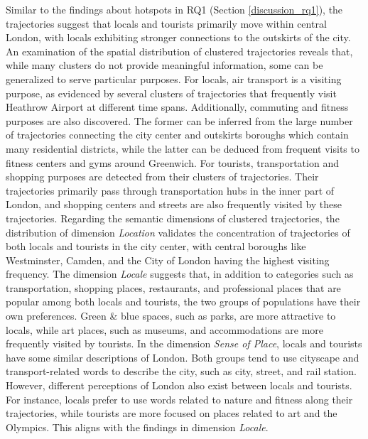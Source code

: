 \documentclass{article}
\theoremstyle{remark}
\begin{document}
Similar to the findings about hotspots in RQ1 (Section \ref{discussion_rq1}), the trajectories suggest that locals and tourists primarily move within central London, with locals exhibiting stronger connections to the outskirts of the city. An examination of the spatial distribution of clustered trajectories reveals that, while many clusters do not provide meaningful information, some can be generalized to serve particular purposes. For locals, air transport is a visiting purpose, as evidenced by several clusters of trajectories that frequently visit Heathrow Airport at different time spans. Additionally, commuting and fitness purposes are also discovered. The former can be inferred from the large number of trajectories connecting the city center and outskirts boroughs which contain many residential districts, while the latter can be deduced from frequent visits to fitness centers and gyms around Greenwich. For tourists, transportation and shopping purposes are detected from their clusters of trajectories. Their trajectories primarily pass through transportation hubs in the inner part of London, and shopping centers and streets are also frequently visited by these trajectories.
Regarding the semantic dimensions of clustered trajectories, the distribution of dimension \textit{Location} validates the concentration of trajectories of both locals and tourists in the city center, with central boroughs like Westminster, Camden, and the City of London having the highest visiting frequency. The dimension \textit{Locale} suggests that, in addition to categories such as transportation, shopping places, restaurants, and professional places that are popular among both locals and tourists, the two groups of populations have their own preferences. Green \& blue spaces, such as parks, are more attractive to locals, while art places, such as museums, and accommodations are more frequently visited by tourists. In the dimension \textit{Sense of Place}, locals and tourists have some similar descriptions of London. Both groups tend to use cityscape and transport-related words to describe the city, such as city, street, and rail station. However, different perceptions of London also exist between locals and tourists. For instance, locals prefer to use words related to nature and fitness along their trajectories, while tourists are more focused on places related to art and the Olympics. This aligns with the findings in dimension \textit{Locale}.
\end{document}
